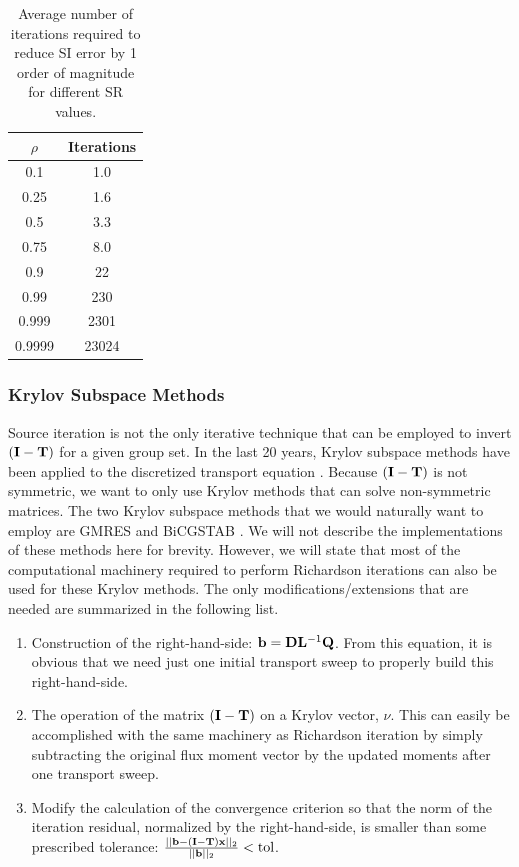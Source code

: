 \begin{table}
\caption{Average number of iterations required to reduce SI error by 1 order of magnitude for different SR values.}
\begin{center}
\begin{tabular}{|c|c|}
\hline
$\rho$ & Iterations \\ \hline \hline
0.1 & 1.0 \\ 
0.25 & 1.6 \\ 
0.5 & 3.3 \\  
0.75 & 8.0 \\ 
0.9 & 22 \\ 
0.99 & 230 \\ 
0.999 & 2301 \\ 
0.9999 & 23024 \\
\hline
\end{tabular}
\end{center}
\label{tab::Sn_convergece_rates}
\end{table}

\subsubsection{Krylov Subspace Methods}
\label{sec::Sn_Solution_Iterative_GMRES}

Source iteration is not the only iterative technique that can be employed to invert $({\bf I} - {\bf T})$ for a given group set. In the last 20 years, Krylov subspace methods have been applied to the discretized transport equation \cite{oliveira1998preconditioned,guthrie1999gmres,patton2002application}. Because $({\bf I} - {\bf T})$ is not symmetric, we want to only use Krylov methods that can solve non-symmetric matrices. The two Krylov subspace methods that we would naturally want to employ are GMRES and BiCGSTAB \cite{saad1986gmres,saad2003iterative}. We will not describe the implementations of these methods here for brevity. However, we will state that most of the computational machinery required to perform Richardson iterations can also be used for these Krylov methods. The only modifications/extensions that are needed are summarized in the following list.

\begin{enumerate}
\item Construction of the right-hand-side: ${\bf b} = {\bf D} {\bf L}^{-1} {\bf Q}$. From this equation, it is obvious that we need just one initial transport sweep to properly build this right-hand-side.
\item The operation of the matrix $({\bf I} - {\bf T})$ on a Krylov vector, $\nu$. This can easily be accomplished with the same machinery as Richardson iteration by simply subtracting the original flux moment vector by the updated moments after one transport sweep.
\item Modify the calculation of the convergence criterion so that the norm of the iteration residual, normalized by the right-hand-side, is smaller than some prescribed tolerance:
$\frac{||{\bf b} - ({\bf I} - {\bf T}) {\bf x} ||_2}{||{\bf b}||_2} < \text{tol}$.
\end{enumerate}

